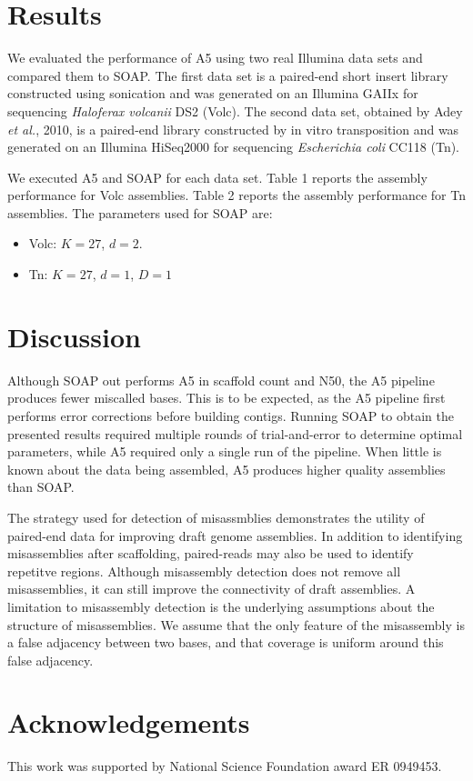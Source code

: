 \documentclass{bioinfo}
\begin{document}
\section{Results}

We evaluated the performance of A5 using two real Illumina data sets and compared them to
SOAP. The first data set is a paired-end short insert library constructed using sonication 
and was generated on an Illumina GAIIx for sequencing \emph{Haloferax volcanii} DS2 (Volc). 
The second data set, obtained by Adey \emph{et al.}, 2010, is a paired-end library constructed 
by in vitro transposition and was generated on an Illumina HiSeq2000 for sequencing \emph{Escherichia coli} CC118 (Tn). 


We executed A5 and SOAP for each data set. Table 1 reports the assembly performance for Volc assemblies.
Table 2 reports the assembly performance for Tn assemblies. The parameters used for SOAP are:
\begin{itemize}
\item Volc: $K = 27$, $d = 2$.
\item Tn: $K = 27$, $d = 1$, $D = 1$
\end{itemize}


\section{Discussion}

Although SOAP out performs A5 in scaffold count and N50, the A5 pipeline produces fewer miscalled bases. This is to
be expected, as the A5 pipeline first performs error corrections before building contigs. Running SOAP to
obtain the presented results required multiple rounds of trial-and-error to determine optimal parameters, while A5 required
only a single run of the pipeline. When little is known about the data being assembled, A5 produces higher quality assemblies 
than SOAP.

The strategy used for detection of misassmblies demonstrates the utility of paired-end data for improving draft genome assemblies.
In addition to identifying misassemblies after scaffolding, paired-reads may also be used to identify repetitve regions.   
Although misassembly detection does not remove all misassemblies, it can still improve the connectivity of draft assemblies.
A limitation to misassembly detection is the underlying assumptions about the structure of misassemblies. We assume that the only
feature of the misassembly is a false adjacency between two bases, and that coverage is uniform around this false adjacency. 


\section*{Acknowledgements}
This work was supported by National Science Foundation award ER 0949453.



\end{document}
